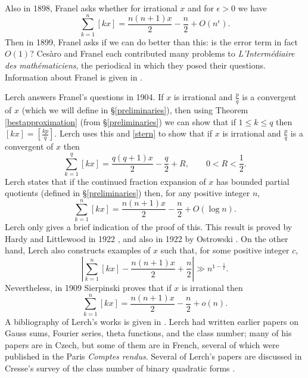 \documentclass{article}
\begin{document}
Also in 1898, Franel \cite{franel1260} asks whether for irrational $x$ and for
$\epsilon>0$ we have
\[
\sum_{k=1}^n [kx]=\frac{n(n+1)x}{2}-\frac{n}{2}+O(n^\epsilon).
\]
Then in 1899, Franel \cite{franel1547} asks if we can do better than this: is the error term in fact $O(1)$?
Ces\`aro and Franel each contributed many problems to {\em L'Inter\-m\'ediaire des math\-\'em\-aticiens}, the periodical in which they posed their questions. Information
about Franel is given in \cite{kollros}.

Lerch \cite{lerch} answers Franel's questions in 1904. If $x$ is irrational and
$\frac{p}{q}$ is a convergent of $x$ (which we will define in \S \ref{preliminaries}), then using 
Theorem \ref{bestapproximation} (from \S \ref{preliminaries}) we can show that if $1 \leq k \leq q$ then $[k x]=[\frac{k p}{q}]$.
Lerch uses this and \eqref{stern} to show that if $x$ is irrational and $\frac{p}{q}$ is a convergent of $x$ then
\[
\sum_{k=1}^q [k x]=\frac{q(q+1)x}{2}-\frac{q}{2}+R, \qquad 0<R<\frac{1}{2}.
\]
Lerch states that if the continued fraction expansion of $x$ has bounded partial quotients (defined in \S \ref{preliminaries}) then, for any positive integer $n$,
\[
\sum_{k=1}^n [kx]=\frac{n(n+1)x}{2}-\frac{n}{2}+O(\log n).
\]
Lerch only gives a brief indication of the proof of this. This result is proved by Hardy and Littlewood in 1922 \cite[p.~24, Theorem B3]{latticeI},
and also in 1922 by Ostrowski \cite[p.~81]{ostrowski1922}.
On the other hand, Lerch also constructs examples of $x$ such that, for some positive integer $c$,
\[
\left| \sum_{k=1}^n [kx]-\frac{n(n+1)x}{2}+\frac{n}{2} \right| \gg n^{1-\frac{1}{c}}.
\]
Nevertheless, in 1909 Sierpinski \cite{sierpinski} proves that if $x$ is irrational then
\[
\sum_{k=1}^n [kx]=\frac{n(n+1)x}{2}-\frac{n}{2}+o(n).
\] 
A bibliography of Lerch's works is given in \cite{skrasek}. Lerch had written
earlier papers on Gauss sums, Fourier series, theta functions, and the class number; many of his papers are in Czech, but some of them are in French, several of which
were published in the Paris {\em Comptes rendus}.
Several of Lerch's papers are discussed in Cresse's survey  of the class number of binary quadratic forms \cite[Chapter VI]{dicksonIII}.
\end{document}
